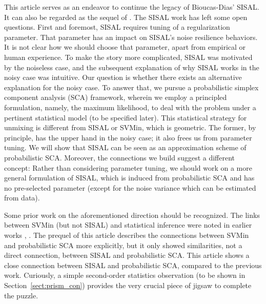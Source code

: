 \documentclass[10pt,twocolumn,twoside]{IEEEtran}
\begin{document}
This article serves as an endeavor to continue the legacy of Bioucas-Dias' SISAL.
It can also be regarded as the sequel of \cite{PRISM2021}.
The SISAL work has left some open questions.
First and foremost, SISAL requires tuning of a regularization parameter.
That parameter has an impact on SISAL's noise resilience behaviors.
It is not clear how we should choose that parameter,
apart from empirical or human experience.
To make the story more complicated, SISAL was motivated by the noiseless case, and the subsequent explanation of why SISAL works in the noisy case was intuitive.
Our question is whether there exists an alternative explanation for the noisy case.
To answer that, we pursue a probabilistic simplex component analysis (SCA) framework, wherein we employ a principled formulation, namely, the maximum likelihood, to deal with the problem under a pertinent statistical model (to be specified later).
This statistical strategy for unmixing is different from SISAL or SVMin, which is geometric.
The former, by principle, has the upper hand in the noisy case; it also frees us from  parameter tuning.
We will show that SISAL can be seen as an approximation scheme of probabilistic SCA.
Moreover, the connections we build suggest a different concept: Rather than considering parameter tuning, we should work on a more general formulation of SISAL, which is induced from probabilistic SCA and has no pre-selected parameter (except for the noise variance which can be estimated from data).

Some prior work on the aforementioned direction should be recognized.
The links between SVMin (but not SISAL) and statistical inference were noted in earlier works \cite{nascimento2009learning,nascimento2012hyperspectral}, \cite[Appendix]{dobigeon2009joint}.
The prequel of this article \cite{PRISM2021} describes the connections between SVMin and probabilistic SCA more explicitly, but it only showed similarities, not a direct connection, between SISAL and probabilistic SCA.
This article shows a close connection between SISAL and probabilistic SCA, compared to the previous work.
Curiously, a simple second-order statistics observation (to be shown in Section~\ref{sect:prism_con}) provides the very crucial piece of jigsaw to complete the puzzle.
\end{document}
